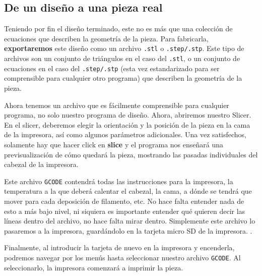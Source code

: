 \subsection{De un diseño a una pieza real}
Teniendo por fin el diseño terminado, este no es más que una colección de ecuaciones que describen la geometría de la pieza. Para fabricarla, \textbf{exportaremos} este diseño como un archivo \texttt{.stl} o \texttt{.step/.stp}. Este tipo de archivos son un conjunto de triángulos en el caso del \texttt{.stl}, o un conjunto de ecuaciones en el caso del \texttt{.step/.stp} (esta vez estandarizado para ser comprensible para cualquier otro programa) que describen la geometría de la pieza. 
\par Ahora tenemos un archivo que es fácilmente comprensible para cualquier programa, no solo nuestro programa de diseño. Ahora, abriremos nuestro Slicer. En el slicer, deberemos elegir la orientación y la posición de la pieza en la cama de la impresora, así como algunos parámetros adicionales. Una vez satisfechos, solamente hay que hacer click en \textbf{slice} y el programa nos enseñará una previsualización de cómo quedará la pieza, mostrando las pasadas individuales del cabezal de la impresora.
\par Este archivo \texttt{GCODE} contendrá todas las instrucciones para la impresora, la temperatura a la que deberá calentar el cabezal, la cama, a dónde se tendrá que mover para cada deposición de filamento, etc. No hace falta entender nada de esto a más bajo nivel, ni siquiera es importante entender qué quieren decir las líneas dentro del archivo, no hace falta mirar dentro. Simplemente este archivo lo pasaremos a la impresora, guardándolo en la tarjeta micro SD de la impresora.
. 
\par Finalmente, al introducir la tarjeta de nuevo en la impresora y encenderla, podremos navegar por los menús hasta seleccionar nuestro archivo \texttt{GCODE}. Al seleccionarlo, la impresora comenzará a imprimir la pieza.

